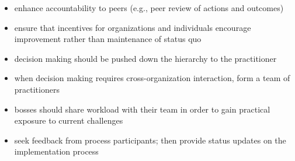 \begin{itemize}
\item enhance accountability to peers (e.g., peer review of actions and outcomes)
\item ensure that incentives for organizations and individuals encourage improvement rather than maintenance of status quo
\item decision making should be pushed down the hierarchy to the practitioner
\item when decision making requires cross-organization interaction, form a team of practitioners
\item bosses should share workload with their team in order to gain practical exposure to current challenges
\item seek feedback from process participants; then provide status updates on the implementation process
\end{itemize}
